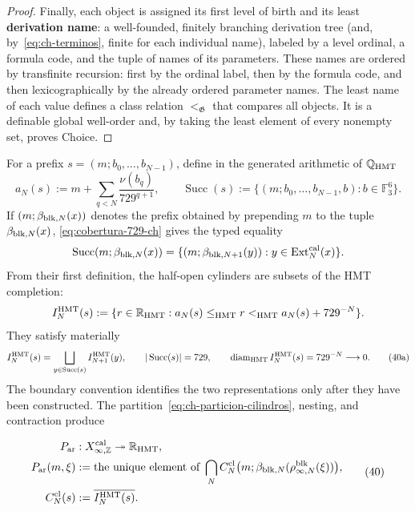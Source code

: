 \begin{proof}
Finally, each object is assigned its first level of birth and its least
\textbf{derivation name}: a well-founded, finitely branching derivation tree
(and, by~\eqref{eq:ch-terminos}, finite for each individual name), labeled by
a level ordinal, a formula code, and the tuple of names of its parameters.
These names are ordered by transfinite recursion: first by the ordinal label,
then by the formula code, and then lexicographically by the already ordered
parameter names. The least name of each value defines a class relation
\(<_{\mathfrak G}\) that compares all objects. It is a definable global
well-order and, by taking the least element of every nonempty set, proves
Choice.
\end{proof}





For a prefix \(s=(m;b_0,\ldots,b_{N-1})\), define in the generated arithmetic
of \(\mathbb Q_{\rm HMT}\)
\[
 a_N(s):=m+\sum_{q<N}\frac{\nu(b_q)}{729^{q+1}},
 \qquad
 \operatorname{Succ}(s):=
 \{(m;b_0,\ldots,b_{N-1},b):b\in\mathbb F_3^6\}.
\]
If \((m;\beta_{{\rm blk},N}(x))\) denotes the prefix obtained by prepending
\(m\) to the tuple \(\beta_{{\rm blk},N}(x)\),
\eqref{eq:cobertura-729-ch} gives the typed equality
\[
 \operatorname{Succ}(m;\beta_{{\rm blk},N}(x))
 =\{(m;\beta_{{\rm blk},N+1}(y)):
       y\in\operatorname{Ext}^{\rm cal}_N(x)\}.
\]
From their first definition, the half-open cylinders are subsets of the HMT
completion:
\[
 I_N^{\rm HMT}(s):=
 \{r\in\mathbb R_{\rm HMT}:
      a_N(s)\le_{\rm HMT}r<_{\rm HMT}a_N(s)+729^{-N}\}.
\]
They satisfy materially
\[
 I_N^{\rm HMT}(s)=
 \bigsqcup_{y\in\operatorname{Succ}(s)}I_{N+1}^{\rm HMT}(y),
 \qquad |\operatorname{Succ}(s)|=729,
 \qquad \operatorname{diam}_{\rm HMT}I_N^{\rm HMT}(s)
      =729^{-N}\longrightarrow0.
\tag{40a}\label{eq:ch-particion-cilindros}
\]
The boundary convention identifies the two representations only after they
have been constructed. The partition~\eqref{eq:ch-particion-cilindros},
nesting, and contraction produce

\[
\begin{aligned}
 P_{\rm ar}&:X_{\infty,\mathbb Z}^{\rm cal}
     \twoheadrightarrow\mathbb R_{\rm HMT},\\
 P_{\rm ar}(m,\xi)
   &:=\text{the unique element of }
     \bigcap_N C_N^{\rm cl}
       \bigl(m;\beta_{{\rm blk},N}(\rho^{\rm blk}_{\infty,N}(\xi))\bigr),\\
 C_N^{\rm cl}(s)&:=\overline{I_N^{\rm HMT}(s)}.
\end{aligned}
\tag{40}\label{eq:ch-proyeccion-arquimediana}
\]


